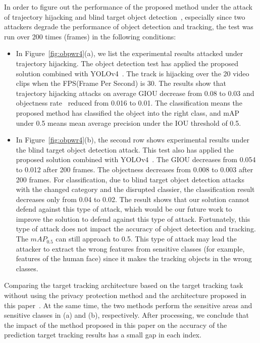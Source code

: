 \documentclass[trans]{IEEEtran}
\newcommand{\el}[1]{{\color{black}#1}}
\begin{document}
In order to figure out the performance of the proposed method under the attack of trajectory hijacking and \el{ blind} target object detection~\cite{jia2020fooling}, especially since two attackers degrade the performance of object detection and tracking, the test was run over 200 times (frames) in the following conditions:
\begin{itemize}
    \item In Figure~\ref{fig:obpwr4}(a), we list the experimental results attacked under trajectory hijacking. The object detection test \el{ has applied} the proposed solution combined with YOLOv4~\cite{bochkovskiy2020yolov4}. The track is hijacking over the 20 video clips when the FPS(Frame Per Second) is 30. The results show that trajectory hijacking attacks on average GIOU decrease from 0.08 to 0.03 and objectness rate~\cite{alexe2012measuring} reduced from 0.016 to 0.01. \el{The classification means the proposed method has classified the object into the right class, and mAP under 0.5 means mean average precision under the IOU threshold of 0.5.} 
    
    \item In Figure~\ref{fig:obpwr4}(b), the second row shows experimental results under the \el{ blind target object detection attack. This test also  has applied the proposed solution combined with YOLOv4~\cite{bochkovskiy2020yolov4}. The GIOU decreases from 0.054 to 0.012 after 200 frames. The objectness decreases from 0.008 to 0.003 after 200 frames. For classification, due to blind target object detection attacks with the changed category and the disrupted classier, the classification result decreases only from 0.04 to 0.02. The result shows that our solution cannot defend against this type of attack, which would be our future work to improve the solution to defend against this type of attack. Fortunately, this type of attack does not impact the accuracy of object detection and tracking. The $mAP_{0.5}$ can still approach to 0.5. This type of attack may lead the attacker to extract the wrong features from sensitive classes (for example, features of the human face) since it makes the tracking objects in the wrong classes. }  
\end{itemize}

Comparing the target tracking architecture based on the target tracking task without using the privacy protection method and the architecture proposed in this paper~\cite{cheng2014bing}. At the same time, the two methods perform the sensitive areas and sensitive classes in (a) and (b), respectively. After processing, we \el{ conclude} that the impact of the method proposed in this paper on the accuracy of the prediction target tracking results has a small gap in each index.
\end{document}
